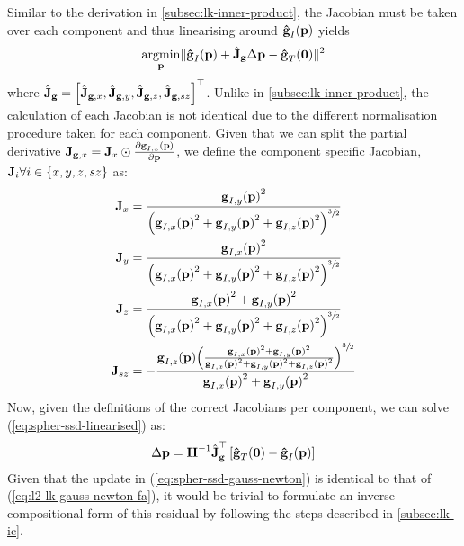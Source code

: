 Similar to the derivation in \cref{subsec:lk-inner-product}, the Jacobian
must be taken over each component and thus linearising around
$\bb{\hat{g}}_I(\p)$ yields
\begin{equation}\label{eq:spher-ssd-linearised}
    \argmin_{\p} \norm{\bb{\hat{g}}_{I}(\p) + \hat{\bb{J}}_{\bb{g}} \Delta \p - \bb{\hat{g}}_{T}(\zero)}^2
\end{equation}
where
$\hat{\bb{J}}_{\bb{g}} = {\left[ \hat{\bb{J}}_{\bb{g},x}, \hat{\bb{J}}_{\bb{g},y}, \hat{\bb{J}}_{\bb{g},z}, \hat{\bb{J}}_{\bb{g},sz} \right]}^{\top}$. 
Unlike in \cref{subsec:lk-inner-product}, the calculation of each 
Jacobian is not identical due to the different normalisation procedure taken 
for each component. Given that we can split the partial derivative
$\bb{J}_{\bb{g},x} = \bb{J}_x \odot \frac{\partial \bb{g}_{I,x}(\p)}{\partial \p}$, 
we define the component specific Jacobian,
$\bb{J}_i \nobreak \forall \nobreak i \in \nobreak \{ x,y,z,sz \}$ as:
\begin{equation}\label{eq:spher-ssd-chain-rule}
    \begin{aligned}
        \bb{J}_x    &= \frac{{\bb{g}_{I,y}(\p)}^2}{{\left({\bb{g}_{I,x}(\p)}^2 + {\bb{g}_{I,y}(\p)}^2 + {\bb{g}_{I,z}(\p)}^2 \right)}^{\sfrac{3}{2}}} \\
        \bb{J}_y    &= \frac{{\bb{g}_{I,x}(\p)}^2}{{\left({\bb{g}_{I,x}(\p)}^2 + {\bb{g}_{I,y}(\p)}^2 + {\bb{g}_{I,z}(\p)}^2 \right)}^{\sfrac{3}{2}}} \\
        \bb{J}_z    &= \frac{{\bb{g}_{I,x}(\p)}^2 + {\bb{g}_{I,y}(\p)}^2}{{\left({\bb{g}_{I,x}(\p)}^2 + {\bb{g}_{I,y}(\p)}^2 + {\bb{g}_{I,z}(\p)}^2 \right)}^{\sfrac{3}{2}}} \\
        \bb{J}_{sz} &= - \frac{\bb{g}_{I,z}(\p) {\left( \frac{{\bb{g}_{I,x}(\p)}^2 + {\bb{g}_{I,y}(\p)}^2}{{\bb{g}_{I,x}(\p)}^2 + {\bb{g}_{I,y}(\p)}^2 + {\bb{g}_{I,z}(\p)}^2} \right)}^{\sfrac{3}{2}}}{{\bb{g}_{I,x}(\p)}^2 + {\bb{g}_{I,y}(\p)}^2}
    \end{aligned}
\end{equation}
Now, given the definitions of the correct Jacobians per component, we can solve 
(\ref{eq:spher-ssd-linearised}) as:
\begin{equation}\label{eq:spher-ssd-gauss-newton}
    \Delta \p = \bb{H}^{-1} \hat{\bb{J}}_{\bb{g}}^{\top} \left[ \bb{\hat{g}}_{T}(\zero) - \bb{\hat{g}}_{I}(\p) \right]
\end{equation}
Given that the update in (\ref{eq:spher-ssd-gauss-newton}) is identical to that
of (\ref{eq:l2-lk-gauss-newton-fa}), it would be trivial to formulate an inverse
compositional form of this residual by following the steps described in
\cref{subsec:lk-ic}.
